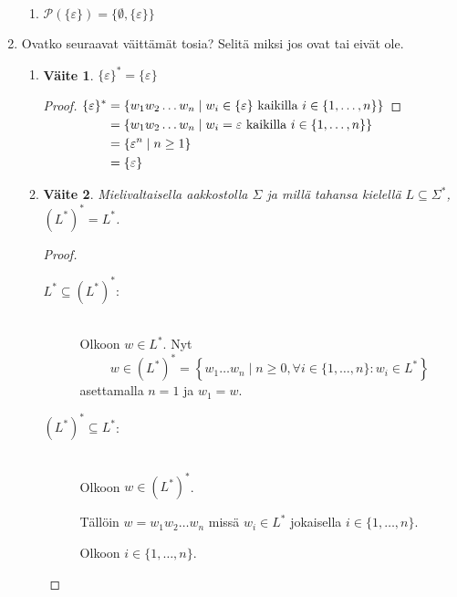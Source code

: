 \documentclass[a4paper,11pt,draft]{article}
\newtheorem*{claim}{Väite}
\newenvironment{lalign}%
{\begin{math}\begin{aligned}[t]}%
{\end{aligned}\end{math}}
\begin{document}
\begin{enumerate}
\begin{enumerate}
  \item
    $\mathcal{P}(\{\varepsilon\}) = \{\emptyset, \{\varepsilon\}\}$
  \end{enumerate}

\item Ovatko seuraavat väittämät tosia? Selitä miksi jos ovat tai
  eivät ole.
  \begin{enumerate}
  \item
    \begin{claim}
      $\{\varepsilon\}^{*} = \{\varepsilon\}$
    \end{claim}
    \begin{proof}
      \begin{lalign}
        \{\varepsilon\}^*
        &= \{w_1w_2 \ldots w_n \mid w_i \in \{\varepsilon\}
           \text{ kaikilla } i \in \{1, \ldots, n\}\}\\
        &= \{w_1w_2 \ldots w_n \mid w_i = \varepsilon
           \text{ kaikilla } i \in \{1, \ldots, n\}\}\\
        &= \{\varepsilon^n \mid n \ge 1\}\\
        &= \{\varepsilon\} \qedhere
      \end{lalign}
    \end{proof}

\newpage
  \item
    \begin{claim}
      Mielivaltaisella aakkostolla $\Sigma$ ja millä tahansa kielellä
      $L \subseteq \Sigma^*$, $(L^*)^* = L^*$.
    \end{claim}
    \begin{proof}
      \hfill
      \begin{description}
      \item[$L^* \subseteq (L^*)^*$:] \hfill \\
        Olkoon $w \in L^*$. Nyt
        \begin{equation*}
        w \in (L^*)^* = \left\{w_1 \ldots w_n \mid n \ge 0,\forall i
        \in \{1, \ldots, n\}: w_i \in L^* \right\}
        \end{equation*}
        asettamalla $n = 1$ ja $w_1 = w$.
      \item[$(L^*)^* \subseteq L^*$:] \hfill \\
        Olkoon $w \in (L^*)^*$.

        Tällöin $w = w_1w_2 \ldots w_n$ missä $w_i \in L^*$ jokaisella
        $i \in \{1, \ldots, n\}$.

        Olkoon $i \in \{1, \ldots, n\}$.


\end{description}
\end{proof}
\end{enumerate}
\end{enumerate}
\end{document}
